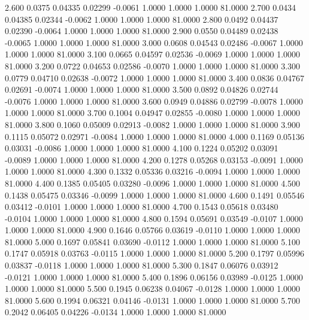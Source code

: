    2.600   0.0375   0.04335   0.02299  -0.0061   1.0000   1.0000   1.0000  81.0000
   2.700   0.0434   0.04385   0.02344  -0.0062   1.0000   1.0000   1.0000  81.0000
   2.800   0.0492   0.04437   0.02390  -0.0064   1.0000   1.0000   1.0000  81.0000
   2.900   0.0550   0.04489   0.02438  -0.0065   1.0000   1.0000   1.0000  81.0000
   3.000   0.0608   0.04543   0.02486  -0.0067   1.0000   1.0000   1.0000  81.0000
   3.100   0.0665   0.04597   0.02536  -0.0069   1.0000   1.0000   1.0000  81.0000
   3.200   0.0722   0.04653   0.02586  -0.0070   1.0000   1.0000   1.0000  81.0000
   3.300   0.0779   0.04710   0.02638  -0.0072   1.0000   1.0000   1.0000  81.0000
   3.400   0.0836   0.04767   0.02691  -0.0074   1.0000   1.0000   1.0000  81.0000
   3.500   0.0892   0.04826   0.02744  -0.0076   1.0000   1.0000   1.0000  81.0000
   3.600   0.0949   0.04886   0.02799  -0.0078   1.0000   1.0000   1.0000  81.0000
   3.700   0.1004   0.04947   0.02855  -0.0080   1.0000   1.0000   1.0000  81.0000
   3.800   0.1060   0.05009   0.02913  -0.0082   1.0000   1.0000   1.0000  81.0000
   3.900   0.1115   0.05072   0.02971  -0.0084   1.0000   1.0000   1.0000  81.0000
   4.000   0.1169   0.05136   0.03031  -0.0086   1.0000   1.0000   1.0000  81.0000
   4.100   0.1224   0.05202   0.03091  -0.0089   1.0000   1.0000   1.0000  81.0000
   4.200   0.1278   0.05268   0.03153  -0.0091   1.0000   1.0000   1.0000  81.0000
   4.300   0.1332   0.05336   0.03216  -0.0094   1.0000   1.0000   1.0000  81.0000
   4.400   0.1385   0.05405   0.03280  -0.0096   1.0000   1.0000   1.0000  81.0000
   4.500   0.1438   0.05475   0.03346  -0.0099   1.0000   1.0000   1.0000  81.0000
   4.600   0.1491   0.05546   0.03412  -0.0101   1.0000   1.0000   1.0000  81.0000
   4.700   0.1543   0.05618   0.03480  -0.0104   1.0000   1.0000   1.0000  81.0000
   4.800   0.1594   0.05691   0.03549  -0.0107   1.0000   1.0000   1.0000  81.0000
   4.900   0.1646   0.05766   0.03619  -0.0110   1.0000   1.0000   1.0000  81.0000
   5.000   0.1697   0.05841   0.03690  -0.0112   1.0000   1.0000   1.0000  81.0000
   5.100   0.1747   0.05918   0.03763  -0.0115   1.0000   1.0000   1.0000  81.0000
   5.200   0.1797   0.05996   0.03837  -0.0118   1.0000   1.0000   1.0000  81.0000
   5.300   0.1847   0.06076   0.03912  -0.0121   1.0000   1.0000   1.0000  81.0000
   5.400   0.1896   0.06156   0.03989  -0.0125   1.0000   1.0000   1.0000  81.0000
   5.500   0.1945   0.06238   0.04067  -0.0128   1.0000   1.0000   1.0000  81.0000
   5.600   0.1994   0.06321   0.04146  -0.0131   1.0000   1.0000   1.0000  81.0000
   5.700   0.2042   0.06405   0.04226  -0.0134   1.0000   1.0000   1.0000  81.0000

